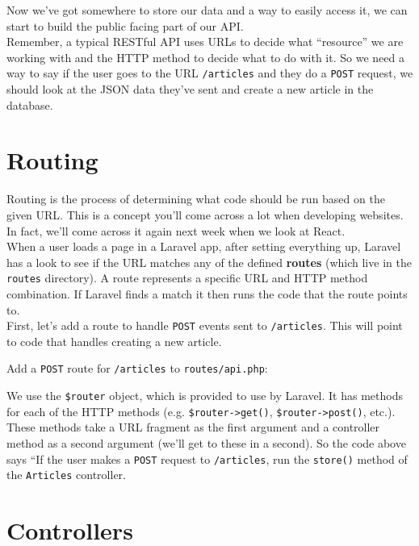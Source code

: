 Now we've got somewhere to store our data and a way to easily access it, we can start to build the public facing part of our API.
\\

Remember, a typical RESTful API uses URLs to decide what ``resource'' we are working with and the HTTP method to decide what to do with it. So we need a way to say if the user goes to the URL \texttt{/articles} and they do a \texttt{POST} request, we should look at the JSON data they've sent and create a new article in the database.


\section{Routing}

Routing is the process of determining what code should be run based on the given URL. This is a concept you'll come across a lot when developing websites. In fact, we'll come across it again next week when we look at React.
\\

When a user loads a page in a Laravel app, after setting everything up, Laravel has a look to see if the URL matches any of the defined \textbf{routes} (which live in the \texttt{routes} directory). A route represents a specific URL and HTTP method combination. If Laravel finds a match it then runs the code that the route points to.
\\

First, let's add a route to handle \texttt{POST} events sent to \texttt{/articles}. This will point to code that handles creating a new article.

\pagebreak

Add a \texttt{POST} route for \texttt{/articles} to \texttt{routes/api.php}:


We use the \texttt{\$router} object, which is provided to use by Laravel. It has methods for each of the HTTP methods (e.g. \texttt{\$router->get()}, \texttt{\$router->post()}, etc.). These methods take a URL fragment as the first argument and a controller  method as a second argument (we'll get to these in a second). So the code above says ``If the user makes a \texttt{POST} request to \texttt{/articles}, run the \texttt{store()} method of the \texttt{Articles} controller.



\section{Controllers}

